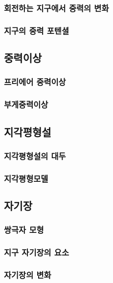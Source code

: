 \subsubsection{회전하는 지구에서 중력의 변화}\index{}
\subsubsection{지구의 중력 포텐셜}\index{}

\subsection{중력이상}\index{}
\subsubsection{프리에어 중력이상}\index{}
\subsubsection{부게중력이상}\index{}
\subsection{지각평형설}\index{}
\subsubsection{지각평형설의 대두}\index{}
\subsubsection{지각평형모델}\index{}

\subsection{자기장}\index{}
\subsubsection{쌍극자 모형}\index{}
\subsubsection{지구 자기장의 요소}\index{}
\subsubsection{자기장의 변화}\index{}